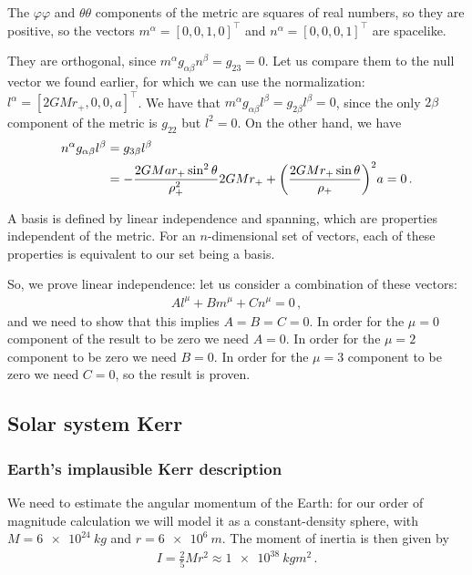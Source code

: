 \documentclass[main.tex]{subfiles}
\begin{document}
The \(\varphi \varphi \) and \(\theta \theta \) components of the metric are squares of real numbers, so they are positive, so the vectors \(m^{\alpha } = [0,0,1,0]^{\top}\) and \(n^{\alpha } = [0,0,0,1]^{\top}\) are spacelike. 

They are orthogonal, since \(m^{\alpha } g_{\alpha \beta } n^{\beta } = g_{23} =0 \). 
Let us compare them to the null vector we found earlier, for which we can use the normalization: \(l^{\alpha } = [2GMr_{+}, 0, 0, a]^{\top}\). 
We have that \(m^{\alpha } g_{\alpha \beta } l^{\beta } = g_{2 \beta } l^{\beta }=  0\), since the only \(2 \beta \) component of the metric is \(g_{22 }\) but \(l^{2}=0\). On the other hand, we have 
%
\begin{align}
  n^{\alpha }g_{\alpha \beta } l^{\beta } 
  &= g_{3 \beta } l^{\beta } \\
  &= -\frac{ 2GMar_{+}\sin^2\theta }{\rho_{+}^2} 2GMr_{+}
  + \qty(\frac{2GMr_{+} \sin \theta }{\rho_{+}})^2 a = 0
\,.
\end{align}

A basis is defined by linear independence and spanning, which are properties independent of the metric. For an \(n\)-dimensional set of vectors, each of these properties is equivalent to our set being a basis.

So, we prove linear independence: let us consider a combination of these vectors: 
%
\begin{align}
  A l^{\mu } + B m^{\mu } + C n^{\mu } = 0
\,,
\end{align}
%
and we need to show that this implies \(A = B = C = 0\). 
In order for the \(\mu = 0\) component of the result to be zero we need \(A = 0\). In order for the \(\mu =2\) component to be zero we need \(B = 0\). In order for the \(\mu = 3\) component to be zero we need \(C = 0\), so the result is proven. 

\subsection{Solar system Kerr}

\subsubsection{Earth's implausible Kerr description}

We need to estimate the angular momentum of the Earth: for our order of magnitude calculation we will model it as a constant-density sphere, with \(M = \SI{6e+24}{kg}\) and \(r = \SI{6e6}{m}\). The moment of inertia is then given by 
%
\begin{align}
  I = \frac{2}{5} M r^{2} \approx \SI{1e38}{kg m^2}
\,.
\end{align}
\end{document}
